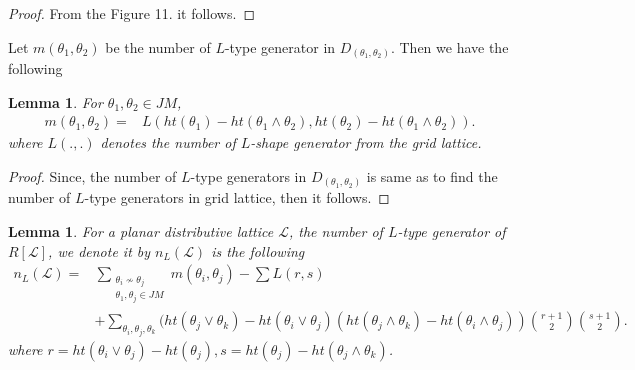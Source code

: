 \documentclass[10pt,reqno]{amsart}
\numberwithin{equation}{section}
\newtheorem{lemma}[theorem]{Lemma}
\begin{document}
 \begin{figure}[H] 
\label{L}
\caption{}
\end{figure}
 \begin{proof}
From the Figure 11. it follows.
\end{proof}
Let $m(\theta_1,\theta_2)$ be the number of $L$-type generator in $D_{(\theta_1,\theta_2)}$. Then we have the following
\begin{lemma}
 For $\theta_1,\theta_2 \in JM$,
 \begin{align*}
  m(\theta_1,\theta_2)=& L(ht(\theta_1)-ht(\theta_1 \wedge \theta_2),ht(\theta_2)-ht(\theta_1 \wedge \theta_2)).
 \end{align*}
where $L(.,.)$ denotes the number of $L$-shape generator from the grid lattice.
\end{lemma}
\begin{proof}
Since, the number of $L$-type generators in $D_{(\theta_1,\theta_2)}$ is same as to find the number of $L$-type generators in grid lattice, then it follows.
\end{proof}
\begin{lemma}
\label{two}
 For a planar distributive lattice $\mathcal{L}$, the number of $L$-type generator of $R[\mathcal{L}]$, we denote it by 
 $n_{L}(\mathcal{L})$ is the following
 \begin{align*} 
  n_{L}(\mathcal{L})=& \sum_{\substack{\theta_i \nsim \theta_j \\ \theta_1,\theta_j \in JM}}m(\theta_i,\theta_j) -\sum L (r,s)\\&
  + \sum_{\theta_i,\theta_j,\theta_k}(ht(\theta_j \vee \theta_k)-ht(\theta_i \vee \theta_j)
  (ht(\theta_j \wedge \theta_k)-ht(\theta_i \wedge \theta_j)) 
  \binom{r+1}{2} \binom{s+1}{2}.
   \end{align*}
   where $r=ht(\theta_i \vee \theta_j)-ht(\theta_j), s=ht(\theta_j)-ht(\theta_j \wedge \theta_k)$.
\end{lemma}
\end{document}
